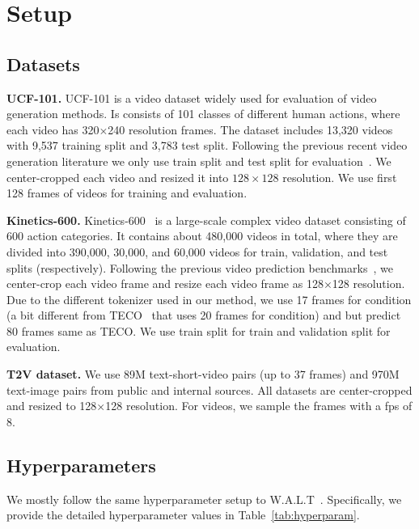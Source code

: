 \section{Setup}
\label{appen:setup}

\subsection{Datasets}
\label{appen:dataset}
\textbf{UCF-101.}
UCF-101 \citep{soomro2012ucf101} is a video dataset widely used for evaluation of video generation methods. Is consists of 101 classes of different human actions, where each video has 320$\times$240 resolution frames. The dataset includes 13,320 videos with 9,537 training split and 3,783 test split. Following the previous recent video generation literature we only use train split and test split for evaluation~\citep{yu2023magvit, singer2022make}. We center-cropped each video and resized it into $128\times128$ resolution. We use first 128 frames of videos for training and evaluation.

\vspace{0.02in}
\noindent\textbf{Kinetics-600.} Kinetics-600~\citep{kay2017kinetics} is a large-scale complex video dataset consisting of 600 action categories. It contains about 480,000 videos in total, where they are divided into 390,000, 30,000, and 60,000 videos for train, validation, and test splits (respectively). Following the previous video prediction benchmarks~\citep{gupta2023photorealistic,yan2023temporally,yu2023magvit}, we center-crop each video frame and resize each video frame as 128$\times$128 resolution. Due to the different tokenizer used in our method, we use 17 frames for condition (a bit different from TECO~\citep{yan2023temporally} that uses 20 frames for condition) and but predict 80 frames same as TECO. We use train split for train and validation split for evaluation.

\vspace{0.02in}
\textbf{T2V dataset.}
We use 89M text-short-video pairs (up to 37 frames) and 970M text-image pairs from public and internal sources. All datasets are center-cropped and resized to 128$\times$128 resolution. For videos, we sample the frames with a fps of 8.

\subsection{Hyperparameters}
We mostly follow the same hyperparameter setup to W.A.L.T~\citep{gupta2023photorealistic}. Specifically, we provide the detailed hyperparameter values in Table~\ref{tab:hyperparam}.

